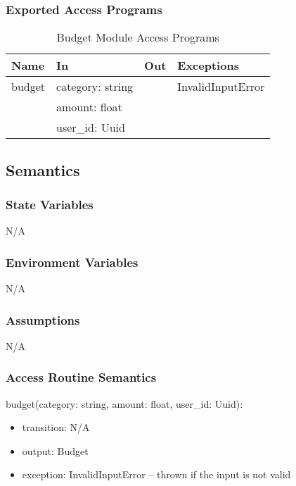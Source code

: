 \documentclass[12pt, titlepage]{article}
\begin{document}
\subsubsection{Exported Access Programs}

\begin{center}
  \begin{table}[H]
    \caption{Budget Module Access Programs}
\begin{tabular}{p{4cm} p{4cm} p{4cm} p{4cm}}
\hline
\textbf{Name} & \textbf{In} & \textbf{Out} & \textbf{Exceptions} \\
\hline
budget & category: string &  & InvalidInputError \\
  & amount: float &  &  \\
  & user\_id: Uuid &  &  \\
\hline
\end{tabular}
\end{table}
\end{center}

\subsection{Semantics}

\subsubsection{State Variables}
N/A

\subsubsection{Environment Variables}
N/A

\subsubsection{Assumptions}
N/A

\subsubsection{Access Routine Semantics}

\noindent budget(category: string, amount: float, user\_id: Uuid):
\begin{itemize}
\item transition: N/A
\item output: Budget
\item exception: InvalidInputError -- thrown if the input is not valid
\end{itemize}
\end{document}
